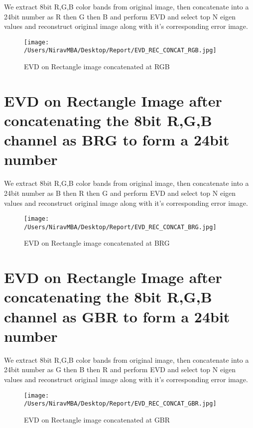 \documentclass[12pt]{report}
\begin{document}
We extract 8bit R,G,B color bands from original image, then concatenate into a 24bit number as R then G then B and perform EVD and select top N eigen values and reconstruct original image along with it's corresponding error image.\\



\begin{figure}[H]
	
	\texttt{[image: /Users/NiravMBA/Desktop/Report/EVD\_REC\_CONCAT\_RGB.jpg]}
	\caption{EVD on Rectangle image concatenated at RGB}
\end{figure}
\cleardoublepage
\section{EVD on Rectangle Image after concatenating the 8bit R,G,B channel as BRG to form a 24bit number }

We extract 8bit R,G,B color bands from original image, then concatenate into a 24bit number as B then R then G and perform EVD and select top N eigen values and reconstruct original image along with it's corresponding error image.\\



\begin{figure}[H]
	
	\texttt{[image: /Users/NiravMBA/Desktop/Report/EVD\_REC\_CONCAT\_BRG.jpg]}
	\caption{EVD on Rectangle image concatenated at BRG}
\end{figure}
\cleardoublepage

\section{EVD on Rectangle Image after concatenating the 8bit R,G,B channel as GBR to form a 24bit number }

We extract 8bit R,G,B color bands from original image, then concatenate into a 24bit number as G then B then R and perform EVD and select top N eigen values and reconstruct original image along with it's corresponding error image.\\


\begin{figure}[H]
	
	\texttt{[image: /Users/NiravMBA/Desktop/Report/EVD\_REC\_CONCAT\_GBR.jpg]}
	\caption{EVD on Rectangle image concatenated at GBR}
\end{figure}
\cleardoublepage
\end{document}
